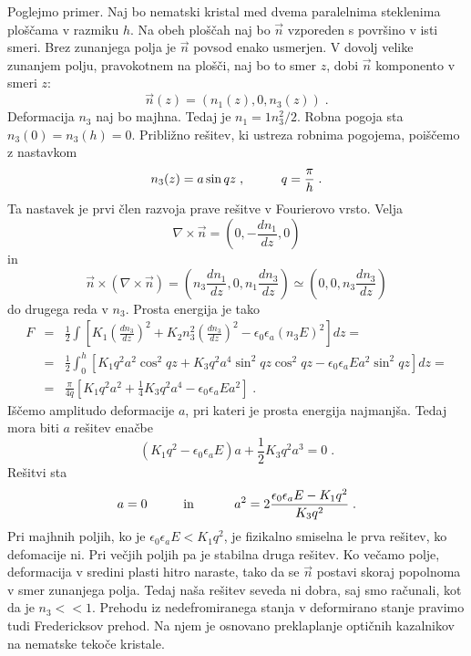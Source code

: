\documentclass[11pt,fleqn]{book} %
\begin{document}
Poglejmo primer. Naj bo nematski kristal med dvema paralelnima steklenima
ploščama v razmiku $h$. Na obeh ploščah naj bo $\vec{n}$ vzporeden
s površino v isti smeri. Brez zunanjega polja je $\vec{n}$ povsod
enako usmerjen. V dovolj velike zunanjem polju, pravokotnem na plošči,
naj bo to smer $z$, dobi $\vec{n}$ komponento v smeri $z$: 
\begin{equation}
\vec{n}(z)=(n_{1}(z),0,n_{3}(z))\;.\label{7.73}
\end{equation}
 Deformacija $n_{3}$ naj bo majhna. Tedaj je $n_{1}=1n_{3}^{2}/2$.
Robna pogoja sta $n_{3}(0)=n_{3}(h)=0$. Približno rešitev, ki ustreza
robnima pogojema, poiščemo z nastavkom 
\begin{equation}
n_{3}(z)=a\sin qz\;,\mbox{\hskip1cm}q=\frac{\pi}{h}\;.\label{7.74}
\end{equation}
 Ta nastavek je prvi člen razvoja prave rešitve v Fourierovo vrsto.
Velja 
\begin{equation}
\nabla\times\vec{n}=(0,-\frac{dn_{1}}{dz},0)\label{7.75}
\end{equation}
 in 
\begin{equation}
\vec{n}\times(\nabla\times\vec{n})=(n_{3}\frac{dn_{1}}{dz},0,n_{1}\frac{dn_{3}}{dz})\simeq(0,0,n_{3}\frac{dn_{3}}{dz})\label{7.76}
\end{equation}
 do drugega reda v $n_{3}$. Prosta energija je tako 
\begin{eqnarray}
F & = & \frac{1}{2}\int\left[K_{1}\left(\frac{dn_{3}}{dz}\right)^{2}+K_{2}n_{3}^{2}\left(\frac{dn_{3}}{dz}\right)^{2}-\epsilon_{0}\epsilon_{a}(n_{3}E)^{2}\right]dz=\nonumber \\
 & = & \frac{1}{2}\int_{0}^{h}[K_{1}q^{2}a^{2}\cos^{2}qz+K_{3}q^{2}a^{4}\sin^{2}qz\cos^{2}qz-\epsilon_{0}\epsilon_{a}Ea^{2}\sin^{2}qz]dz=\nonumber \\
 & = & \frac{\pi}{4q}[K_{1}q^{2}a^{2}+\frac{1}{4}K_{3}q^{2}a^{4}-\epsilon_{0}\epsilon_{a}Ea^{2}]\;.
\end{eqnarray}
 Iščemo amplitudo deformacije $a$, pri kateri je prosta energija
najmanjša. Tedaj mora biti $a$ rešitev enačbe 
\begin{equation}
(K_{1}q^{2}-\epsilon_{0}\epsilon_{a}E)a+\frac{1}{2}K_{3}q^{2}a^{3}=0\;.\label{7.78}
\end{equation}
 Rešitvi sta 
\begin{equation}
a=0\mbox{\hskip1cm in \hskip1cm}a^{2}=2\frac{\epsilon_{0}\epsilon_{a}E-K_{1}q^{2}}{K_{3}q^{2}}\;.\label{7.79}
\end{equation}
 Pri majhnih poljih, ko je $\epsilon_{0}\epsilon_{a}E<K_{1}q^{2}$,
je fizikalno smiselna le prva rešitev, ko defomacije ni. Pri večjih
poljih pa je stabilna druga rešitev. Ko večamo polje, deformacija
v sredini plasti hitro naraste, tako da se $\vec{n}$ postavi skoraj
popolnoma v smer zunanjega polja. Tedaj naša rešitev seveda ni dobra,
saj smo računali, kot da je $n_{3}<<1$. Prehodu iz nedefromiranega
stanja v deformirano stanje pravimo tudi Fredericksov prehod. Na njem
je osnovano preklaplanje optičnih kazalnikov na nematske tekoče kristale.
\end{document}
